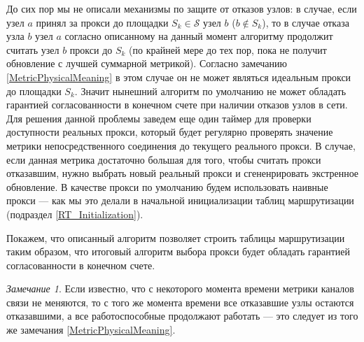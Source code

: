 \documentclass{article}
\theoremstyle{plain}
\theoremstyle{plain}
\theoremstyle{plain}
\theoremstyle{plain}
\theoremstyle{definition}
\theoremstyle{remark}
\newtheorem{remark}{Замечание}[section]
\theoremstyle{plain}
\begin{document}
До сих пор мы не описали механизмы по защите от отказов узлов: в случае, если узел $a$ принял за прокси до площадки $S_k \in \mathcal{S}$ узел $b$ ($b \notin S_k$), то в случае отказа узла $b$ узел $a$ согласно описанному на данный момент алгоритму продолжит считать узел $b$ прокси до $S_k$ (по крайней мере до тех пор, пока не получит обновление с лучшей суммарной метрикой). Согласно замечанию \ref{MetricPhysicalMeaning} в этом случае он не может являться идеальным прокси до площадки $S_k$. Значит нынешний алгоритм по умолчанию не может обладать гарантией согласованности в конечном счете при наличии отказов узлов в сети. Для решения данной проблемы заведем еще один таймер для проверки доступности реальных прокси, который будет регулярно проверять значение метрики непосредственного соединения до текущего реального прокси. В случае, если данная метрика достаточно большая для того, чтобы считать прокси отказавшим, нужно выбрать новый реальный прокси и сгененрировать экстренное обновление. В качестве прокси по умолчанию будем использовать наивные прокси --- как мы это делали в начальной инициализации таблиц маршрутизации (подраздел \ref{RT_Initialization}).

Покажем, что описанный алгоритм позволяет строить таблицы маршрутизации таким образом, что итоговый алгоритм выбора прокси будет обладать гарантией согласованности в конечном счете.

\begin{remark}
\label{NoCrashesWhenMetricIsStable}
    Если известно, что с некоторого момента времени метрики каналов связи не меняются, то с того же момента времени все отказавшие узлы остаются отказавшими, а все работоспособные продолжают работать --- это следует из того же замечания \ref{MetricPhysicalMeaning}.
\end{remark}
\end{document}
